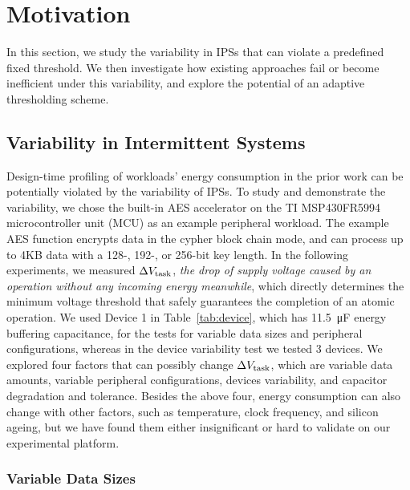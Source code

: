 \section{Motivation} 
\label{sec:design_exploration}

In this section, we study the variability in IPSs that can violate a predefined fixed threshold. 
We then investigate how existing approaches fail or become inefficient under this variability, and explore the potential of an adaptive thresholding scheme. 

\subsection{Variability in Intermittent Systems} 
\label{subsec:dynamic_energy_consumption}
 
Design-time profiling of workloads' energy consumption in the prior work can be potentially violated by the variability of IPSs.
To study and demonstrate the variability, we chose the built-in AES accelerator on the TI MSP430FR5994 microcontroller unit (MCU) as an example peripheral workload.  
The example AES function encrypts data in the cypher block chain mode, and can process up to 4KB data with a 128-, 192-, or 256-bit key length. 
In the following experiments, we measured $\Delta V_{\text{task}}$, \textit{the drop of supply voltage caused by an operation without any incoming energy meanwhile}, which directly determines the minimum voltage threshold that safely guarantees the completion of an atomic operation. 
We used Device 1 in Table~\ref{tab:device}, which has \SI{11.5}{\micro\farad} energy buffering capacitance, for the tests for variable data sizes and peripheral configurations, whereas in the device variability test we tested 3 devices.
We explored four factors that can possibly change $\Delta V_{\text{task}}$, which are variable data amounts, variable peripheral configurations, devices variability, and capacitor degradation and tolerance. 
Besides the above four, energy consumption can also change with other factors, such as temperature, clock frequency, and silicon ageing, but we have found them either insignificant or hard to validate on our experimental platform. 




\subsubsection{Variable Data Sizes}


